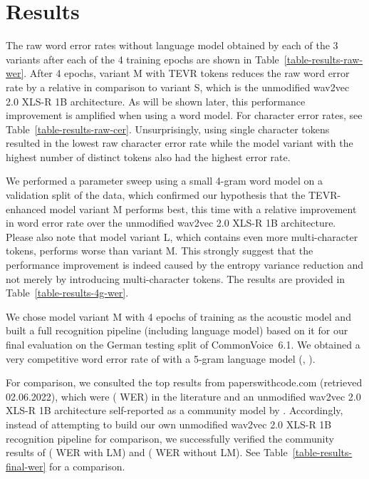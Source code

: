 \documentclass{article} \usepackage{iclr2022_conference,times}
\begin{document}
\FloatBarrier


\section{Results}


The raw word error rates without language model obtained by each of the 3 variants after each of the 4 training epochs are shown in Table~\ref{table-results-raw-wer}. After 4 epochs, variant M with TEVR tokens reduces the raw word error rate by a relative  in comparison to variant S, which is the unmodified wav2vec 2.0 XLS-R 1B architecture. 
As will be shown later, this performance improvement is amplified when using a word model.
For character error rates, see Table~\ref{table-results-raw-cer}. Unsurprisingly, using single character tokens resulted in the lowest raw character error rate while the model variant with the highest number of distinct tokens also had the highest error rate.



We performed a parameter sweep using a small 4-gram word model on a validation split of the data, which confirmed our hypothesis that the TEVR-enhanced model variant M performs best, this time with a relative  improvement in word error rate over the unmodified wav2vec 2.0 XLS-R 1B architecture. Please also note that model variant L, which contains even more multi-character tokens, performs worse than variant M. This strongly suggest that the performance improvement is indeed caused by the entropy variance reduction and not merely by introducing multi-character tokens. The results are provided in Table~\ref{table-results-4g-wer}. 

We chose model variant M with 4 epochs of training as the acoustic model and built a full recognition pipeline (including language model) based on it for our final evaluation on  the German testing split of CommonVoice~6.1. We obtained a very competitive word error rate of  with a 5-gram language model (, ). 



For comparison, we consulted the top results from paperswithcode.com (retrieved 02.06.2022), which were \citet{scribosermo} ( WER) in the literature and an unmodified wav2vec 2.0 XLS-R 1B architecture self-reported as a community model by \citet{flozi}.
Accordingly, instead of attempting to build our own unmodified wav2vec 2.0 XLS-R 1B recognition pipeline for comparison, we successfully verified the community results of \citet{flozi} ( WER with LM) and \citet{grosman} ( WER without LM). 
See Table~\ref{table-results-final-wer} for a comparison.
\end{document}
